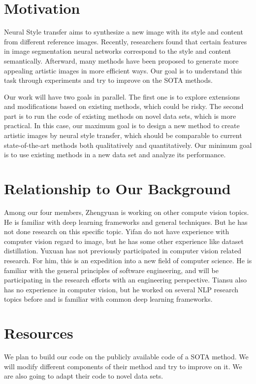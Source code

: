\documentclass[10pt,twocolumn,letterpaper]{article}
\begin{document}
\section{Motivation}

Neural Style transfer aims to synthesize a new image with its style and content from different reference images. Recently, researchers\cite{gatys2016image} found that certain features in image segmentation neural networks correspond to the style and content semantically. Afterward, many methods\cite{huang2017arbitrary,deng2022stytr2,li2017universal} have been proposed to generate more appealing artistic images in more efficient ways. Our goal is to understand this task through experiments and try to improve on the SOTA methods.

Our work will have two goals in parallel. The first one is to explore extensions and modifications based on existing methods, which could be risky. The second part is to run the code of existing methods on novel data sets, which is more practical. 
In this case, our maximum goal is to design a new method to create artistic images by neural style transfer, which should be comparable to current state-of-the-art methods both qualitatively and quantitatively. Our minimum goal is to use existing methods in a new data set and analyze its performance.
\section{Relationship to Our Background}
Among our four members, Zhengyuan is working on other compute vision topics. He is familiar with deep learning frameworks and general techniques. But he has not done research on this specific topic.
Yifan do not have experience with computer vision regard to image, but he has some other experience like dataset distillation. Yuxuan has not previously participated in computer vision related research. For him, this is an expedition into a new field of computer science. He is familiar with the general principles of software engineering, and will be participating in the research efforts with an engineering perspective. 
Tiansu also has no experience in computer vision, but he worked on several NLP research topics before and is familiar with common deep learning frameworks.
\section{Resources}
We plan to build our code on the publicly available code of a SOTA method\cite{deng2022stytr2}. We will modify different components of their method and try to improve on it. We are also going to adapt their code to novel data sets.
\end{document}
